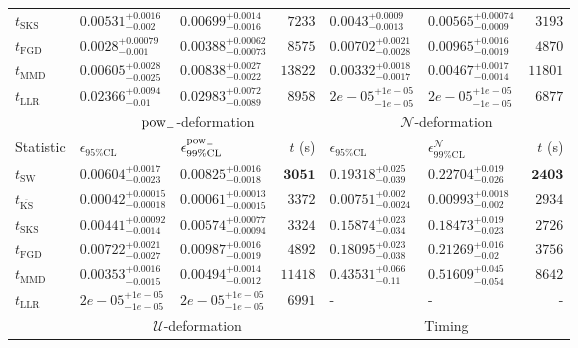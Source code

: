 \begin{tabular}{l|llr|llr}
	$t_{\mathrm{SKS}}$ & $0.00531_{-0.002}^{+0.0016}$ & $0.00699_{-0.0016}^{+0.0014}$ & $7233$ & $0.0043_{-0.0013}^{+0.0009}$ & $0.00565_{-0.0009}^{+0.00074}$ & $3193$ \\
	$t_{\mathrm{FGD}}$ & ${\mathbf{0.0028_{-0.001}^{+0.00079}}}$ & ${\mathbf{0.00388_{-0.00073}^{+0.00062}}}$ & $8575$ & $0.00702_{-0.0028}^{+0.0021}$ & $0.00965_{-0.0019}^{+0.0016}$ & $4870$ \\
	$t_{\mathrm{MMD}}$ & $0.00605_{-0.0025}^{+0.0028}$ & $0.00838_{-0.0022}^{+0.0027}$ & $13822$ & $0.00332_{-0.0017}^{+0.0018}$ & $0.00467_{-0.0014}^{+0.0017}$ & $11801$ \\
	$t_{\mathrm{LLR}}$ & $0.02366_{-0.01}^{+0.0094}$ & $0.02983_{-0.0089}^{+0.0072}$ & $8958$ & $2e-05_{-1e-05}^{+1e-05}$ & $2e-05_{-1e-05}^{+1e-05}$ & $6877$ \\
	\toprule
	\multicolumn{1}{c}{} & \multicolumn{3}{c}{$\rm{pow}_{-}$-deformation} & \multicolumn{3}{c}{$\mathcal{N}$-deformation} \\
	Statistic & $\epsilon_{95\%\mathrm{CL}}$ & $\epsilon^  {\rm{pow}_{-}}_{99\%\mathrm{CL}}$ & $t$ (s) & $\epsilon_{95\%\mathrm{CL}}$ & $\epsilon^    {\mathcal{N}}_{99\%\mathrm{CL}}$ & $t$ (s) \\
	\midrule
	$t_{\mathrm{SW}}$ & $0.00604_{-0.0023}^{+0.0017}$ & $0.00825_{-0.0018}^{+0.0016}$ & ${\mathbf{3051}}$ & $0.19318_{-0.039}^{+0.025}$ & $0.22704_{-0.026}^{+0.019}$ & ${\mathbf{2403}}$ \\
	$t_{\overline{\mathrm{KS}}}$ & ${\mathbf{0.00042_{-0.00018}^{+0.00015}}}$ & ${\mathbf{0.00061_{-0.00015}^{+0.00013}}}$ & $3372$ & ${\mathbf{0.00751_{-0.0024}^{+0.002}}}$ & ${\mathbf{0.00993_{-0.002}^{+0.0018}}}$ & $2934$ \\
	$t_{\mathrm{SKS}}$ & $0.00441_{-0.0014}^{+0.00092}$ & $0.00574_{-0.00094}^{+0.00077}$ & $3324$ & $0.15874_{-0.034}^{+0.023}$ & $0.18473_{-0.023}^{+0.019}$ & $2726$ \\
	$t_{\mathrm{FGD}}$ & $0.00722_{-0.0027}^{+0.0021}$ & $0.00987_{-0.0019}^{+0.0016}$ & $4892$ & $0.18095_{-0.038}^{+0.023}$ & $0.21269_{-0.02}^{+0.016}$ & $3756$ \\
	$t_{\mathrm{MMD}}$ & $0.00353_{-0.0015}^{+0.0016}$ & $0.00494_{-0.0012}^{+0.0014}$ & $11418$ & $0.43531_{-0.11}^{+0.066}$ & $0.51609_{-0.054}^{+0.045}$ & $8642$ \\
	$t_{\mathrm{LLR}}$ & $2e-05_{-1e-05}^{+1e-05}$ & $2e-05_{-1e-05}^{+1e-05}$ & $6991$ & - & - & - \\
	\toprule
	\multicolumn{1}{c}{} & \multicolumn{3}{c}{$\mathcal{U}$-deformation} & \multicolumn{3}{c}{Timing} \\

\end{tabular}
